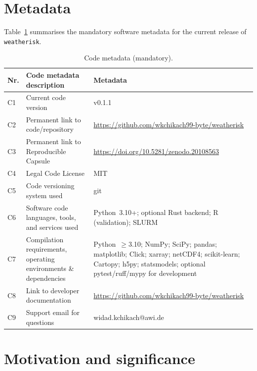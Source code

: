 \documentclass[preprint,12pt,a4paper]{elsarticle}
\begin{document}
\section*{Metadata}
\label{sec:metadata}

Table~\ref{tab:metadata} summarises the mandatory software metadata
for the current release of \texttt{weatherisk}.

\begin{table}[!h]
\small
\begin{tabularx}{\textwidth}{|l|>{\raggedright\arraybackslash}p{4.9cm}|>{\raggedright\arraybackslash}X|}
\hline
\textbf{Nr.} & \textbf{Code metadata description} & \textbf{Metadata} \\
\hline
C1 & Current code version & v0.1.1 \\
\hline
C2 & Permanent link to code/repository &
  \url{https://github.com/wkchikach99-byte/weatherisk} \\
\hline
C3 & Permanent link to Reproducible Capsule &
  \url{https://doi.org/10.5281/zenodo.20108563} \\
\hline
C4 & Legal Code License & MIT \\
\hline
C5 & Code versioning system used & git \\
\hline
C6 & Software code languages, tools, and services used &
  Python~3.10+; optional Rust backend; R (validation); SLURM \\
\hline
C7 & Compilation requirements, operating environments
  \& dependencies &
  Python~$\geq$3.10; NumPy; SciPy; pandas; matplotlib;
  Click; xarray; netCDF4; scikit-learn; Cartopy; h5py;
  statsmodels; optional pytest/ruff/mypy for development \\
\hline
C8 & Link to developer documentation &
  \url{https://github.com/wkchikach99-byte/weatherisk} \\
\hline
C9 & Support email for questions & widad.kchikach@awi.de \\
\hline
\end{tabularx}
\caption{Code metadata (mandatory).}
\label{tab:metadata}
\end{table}


\section{Motivation and significance}
\label{sec:motivation}
\end{document}
